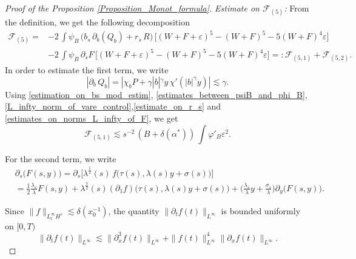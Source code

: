 \documentclass[16pt,english, oneside,reqno]{smfart}
\newcommand{\vare}{{\varepsilon}}
\newcommand{\vphi}{{\varphi}}
\begin{document}
\begin{proof}[Proof of the Proposition \ref{Proposition_Monot_formula}]
\textit{Estimate on $\mathcal{F}_{(5)}$:}
From the definition, we get the following decomposition
\begin{equation}
    \begin{split}
         \mathcal{F}_{(5)} = 
        &-2\,  \int \psi_B\, \big(b_s\,\partial_b(Q_b) + r_s\, R \big)\,\big[ (W+F+\vare)^5-(W+F)^5 - 5 (W+F)^4\vare \big] \\
        & -2\, \int \psi_B\, \partial_s F\, \big[ (W+F+\vare)^5 - (W+F)^5 - 5 (W+F)^4 \vare \big]  =: \mathcal{F}_{(5,1)} + \mathcal{F}_{(5,2)}.
    \end{split}
\end{equation}
In order to estimate the first term, we write
\begin{equation}
    |\partial_b\, Q_b|  = |\chi_b P+\gamma|b|^{\gamma}y\,\chi'(|b|^{\gamma}y)| \lesssim \gamma.
\end{equation}
Using \eqref{estimation_on_bs_mod_estim}, \eqref{estimates_between_psiB_and_phi_B}, \eqref{L_infty_norm_of_vare_control},\eqref{estimate_on_r_s} and \eqref{estimates_on_norms_L_infty_of_F}, we get
\begin{equation}
    \mathcal{F}_{(5,1)} \lesssim s^{-2}\,(B+\delta(\alpha^*))\, \int \vphi'_B \vare^2 .
\end{equation}

For the second term, we write
\begin{equation}
\begin{split}
    & \partial_s\big(F(s,y)\big) = \partial_s \big[ \lambda^{\frac{1}{2}}(s)\,f\big(\tau(s),\lambda(s)y +\sigma(s)\big) \big]\\
    & =\frac{1}{2}\frac{\lambda_s}{\lambda} F(s,y) + \lambda^{\frac{7}{2}}(s)(\partial_1 f)\big(\tau(s), \lambda(s)y+\sigma(s)\big)+ \Big( \frac{\lambda_s}{\lambda}y +\frac{\sigma_s}{\lambda}\Big) \partial_y \big(F(s,y) \big).
\end{split}
\end{equation}

Since $\|f\|_{L^{\infty}_t H^s} \lesssim \delta(x_0^{-1})$, the quantity $\|\partial_t f(t)\|_{L^{\infty}}$ is bounded uniformly on $[0,T)$ 
\begin{equation}
    \|\partial_t f(t)\|_{L^{\infty}} \lesssim \|\partial^3_x f(t) \|_{L^{\infty}} + \|f(t)\|^4_{L^{\infty}} \|\partial_xf(t)\|_{L^{\infty}}.
\end{equation}


\end{proof}
\end{document}
